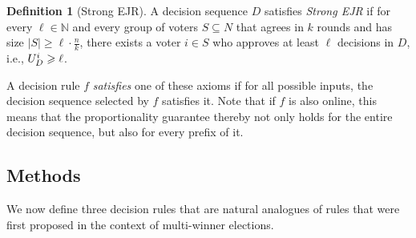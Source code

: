 \documentclass[10pt]{scrartcl}
\theoremstyle{plain}
\theoremstyle{definition}
\newtheorem{definition}[theorem]{Definition}
\renewcommand*{\ge}{\geqslant}
\renewcommand*{\geq}{\geqslant}
\begin{document}
\begin{definition}[Strong EJR]
    \label{def:strongEJR}
    A decision sequence $D$ satisfies \emph{Strong EJR} if  for every $\ell \in \mathbb N$ and every group of voters $S \subseteq N$ that agrees in $k$ rounds and has size $|S| \geq \ell \cdot \frac{n}{k}$, there exists a voter $i \in S$ who approves at least $\ell$ decisions in $D$, i.e., $\smash{U^i_D} \ge \ell$.
\end{definition}

A decision rule $f$ \emph{satisfies} one of these axioms if for all possible inputs, the decision sequence selected by $f$ satisfies it. Note that if $f$ is also online, this means that the proportionality guarantee thereby not only holds for the entire decision sequence, but also for every prefix of it.

\subsection{Methods}

We now define three decision rules that are natural analogues of rules that were first proposed in the context of multi-winner elections.
\end{document}
